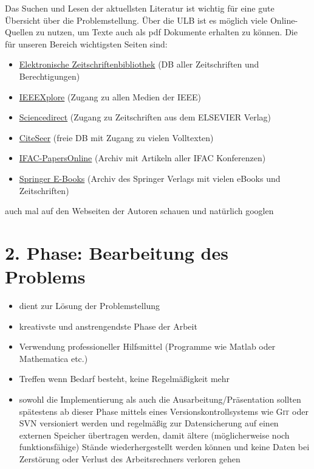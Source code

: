 Das Suchen und Lesen der aktuellsten Literatur ist wichtig für eine gute Übersicht über die
Problemstellung. Über die ULB ist es möglich viele Online-Quellen zu nutzen, um Texte auch als
pdf Dokumente erhalten zu können. Die für unseren Bereich wichtigsten Seiten sind:
\begin{itemize}
	\item \href{http://rzblx1.uni-regensburg.de/ezeit/}{Elektronische Zeitschriftenbibliothek} (DB aller Zeitschriften und Berechtigungen)
	\item \href{http://ieeexplore.ieee.org}{IEEEXplore} (Zugang zu allen Medien der IEEE)
	\item \href{http://www.sciencedirect.com}{Sciencedirect} (Zugang zu Zeitschriften aus dem ELSEVIER Verlag)
	\item \href{http://citeseerx.ist.psu.edu}{CiteSeer} (freie DB mit Zugang zu vielen Volltexten)
	\item \href{http://www.ifac-control.org/publications/ifac-papersonline.net}{IFAC-PapersOnline} (Archiv mit Artikeln aller IFAC Konferenzen)
	\item \href{http://link.springer.com/}{Springer E-Books} (Archiv des Springer Verlags mit vielen eBooks und Zeitschriften)
\end{itemize}
auch mal auf den Webseiten der Autoren schauen und natürlich \glqq{}googlen\grqq{}


\section*{2. Phase: Bearbeitung des Problems}
\label{sec:Bearbeitung}
\begin{itemize}
	\item dient zur Lösung der Problemstellung
	\item kreativste und anstrengendste Phase der Arbeit
	\item Verwendung professioneller Hilfsmittel (Programme wie Matlab oder Mathematica etc.)
	\item Treffen wenn Bedarf besteht, keine Regelmäßigkeit mehr
	\item sowohl die Implementierung als auch die Ausarbeitung/Präsentation sollten spätestens ab dieser Phase mittels eines Versionskontrollsystems wie \bspw \textsc{Git} oder \textsc{SVN} versioniert werden und regelmäßig zur Datensicherung auf einen externen Speicher übertragen werden, damit ältere (möglicherweise noch funktionsfähige) Stände wiederhergestellt werden können und keine Daten bei Zerstörung oder Verlust des Arbeitsrechners verloren gehen
\end{itemize}


